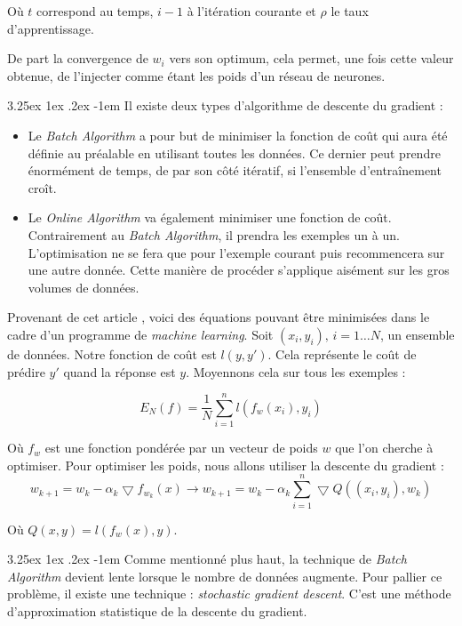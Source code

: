 \documentclass[a4paper, 11pt]{article}
\makeatletter
\renewcommand\paragraph{\@startsection{paragraph}{5}{\z@}%
  {3.25ex \@plus1ex \@minus.2ex}%
  {-1em}%
  {\normalfont\normalsize\bfseries}}
\makeatother
\begin{document}
Où $t$ correspond au temps, $i-1$ à l'itération courante et $\rho$ le taux d'apprentissage.

De part la convergence de $w_i$ vers son optimum, cela permet, une fois cette valeur obtenue, de l'injecter
comme étant les poids d'un réseau de neurones.

\paragraph{}
Il existe deux types d'algorithme de descente du gradient :
\begin{itemize}
\item Le \textit{Batch Algorithm} a pour but de minimiser la fonction de coût qui aura été définie au préalable en utilisant 
toutes les données. Ce dernier peut prendre énormément de temps, de par son côté itératif, si l'ensemble d'entraînement croît.
\item Le \textit{Online Algorithm} va également minimiser une fonction de coût. Contrairement au \textit{Batch Algorithm}, il
prendra les exemples un à un. L'optimisation ne se fera que pour l'exemple courant puis recommencera sur une autre donnée. 
Cette manière de procéder s'applique aisément sur les gros volumes de données.
\end{itemize}

Provenant de cet article \cite{descente_du_gradient_stochastique}, voici des équations pouvant être minimisées dans
le cadre d'un programme de \textit{machine learning}.
Soit $(x_i,y_i)\text{,\ } i=1\dots N$, un ensemble de données. Notre fonction de coût est $l(y,y')$.
Cela représente le coût de prédire $y'$ quand la réponse est $y$. Moyennons cela sur tous les exemples :

$$E_N(f) = \frac{1}{N} \sum_{i=1}^{n}l(f_w(x_i),y_i)$$

Où $f_w$ est une fonction pondérée par un vecteur de poids $w$ que l'on cherche à optimiser.
Pour optimiser les poids, nous allons utiliser la descente du gradient :
$$w_{k+1} = w_k - \alpha_k \bigtriangledown f_{w_k}(x) \rightarrow w_{k+1} =
w_k -\alpha_k \sum_{i=1}^n \bigtriangledown Q ((x_i,y_i), w_k)$$

Où $Q(x,y) = l(f_w(x),y)$.

\paragraph{}
Comme mentionné plus haut, la technique de \textit{Batch Algorithm} devient lente lorsque le nombre de données augmente.
Pour pallier ce problème, il existe une technique : \textit{stochastic gradient descent}. C'est une méthode d'approximation
statistique de la descente du gradient.
\end{document}
